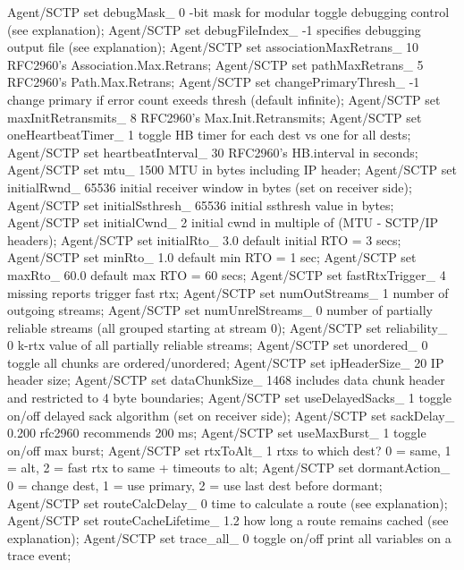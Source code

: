 	 \begin{program}
	 Agent/SCTP set debugMask_ 0 -bit mask for modular toggle debugging control (see explanation);
	 Agent/SCTP set debugFileIndex_ -1 \; specifies debugging output file (see explanation);
	 Agent/SCTP set associationMaxRetrans_ 10\; RFC2960's Association.Max.Retrans;
	 Agent/SCTP set pathMaxRetrans_ 5 \; RFC2960's Path.Max.Retrans;
	 Agent/SCTP set changePrimaryThresh_ -1 \; change primary if error count exeeds thresh (default infinite);
	 Agent/SCTP set maxInitRetransmits_ 8 \; RFC2960's Max.Init.Retransmits;
	 Agent/SCTP set oneHeartbeatTimer_ 1 \; toggle HB timer for each dest vs one for all dests;
	 Agent/SCTP set heartbeatInterval_ 30 \; RFC2960's HB.interval in seconds;
	 Agent/SCTP set mtu_ 1500 \; MTU in bytes including IP header;
	 Agent/SCTP set initialRwnd_ 65536 \; initial receiver window in bytes (set on receiver side);
	 Agent/SCTP set initialSsthresh_ 65536 \; initial ssthresh value in bytes;
	 Agent/SCTP set initialCwnd_ 2 \; initial cwnd in multiple of (MTU - SCTP/IP headers);
	 Agent/SCTP set initialRto_ 3.0 \; default initial RTO = 3 secs;
	 Agent/SCTP set minRto_ 1.0    \; default min RTO = 1 sec;
	 Agent/SCTP set maxRto_ 60.0   \; default max RTO = 60 secs;
	 Agent/SCTP set fastRtxTrigger_ 4  missing reports trigger fast rtx;
	 Agent/SCTP set numOutStreams_ 1 \; number of outgoing streams;
	 Agent/SCTP set numUnrelStreams_ 0 \; number of partially reliable streams (all grouped starting at stream 0);
	 Agent/SCTP set reliability_ 0 \; k-rtx value of all partially reliable streams;
	 Agent/SCTP set unordered_ 0 \; toggle all chunks are ordered/unordered;
	 Agent/SCTP set ipHeaderSize_ 20 \; IP header size;
	 Agent/SCTP set dataChunkSize_ 1468 \; includes data chunk header and restricted to 4 byte boundaries;
	 Agent/SCTP set useDelayedSacks_ 1 \; toggle on/off delayed sack algorithm (set on receiver side);
	 Agent/SCTP set sackDelay_ 0.200 \; rfc2960 recommends 200 ms;
	 Agent/SCTP set useMaxBurst_ 1 \; toggle on/off max burst;
	 Agent/SCTP set rtxToAlt_ 1 \; rtxs to which dest?  0 = same, 1 = alt, 2 = fast rtx to same + timeouts to alt;
	 Agent/SCTP set dormantAction_ 0  = change dest, 1 = use primary, 2 = use last dest before dormant; 
	 Agent/SCTP set routeCalcDelay_ 0 \; time to calculate a route (see explanation);
	 Agent/SCTP set routeCacheLifetime_ 1.2 \; how long a route remains cached (see explanation);
	 Agent/SCTP set trace_all_ 0 \; toggle on/off print all variables on a trace event;
	 \end{program}

